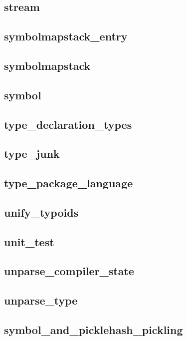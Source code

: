 \subsection{stream}						
\subsection{symbolmapstack\_entry}				
\subsection{symbolmapstack}					
\subsection{symbol}						
\subsection{type\_declaration\_types}				
\subsection{type\_junk}						
\subsection{type\_package\_language}				
\subsection{unify\_typoids}					
\subsection{unit\_test}						
\subsection{unparse\_compiler\_state}				
\subsection{unparse\_type}					
\subsection{symbol\_and\_picklehash\_pickling}			
